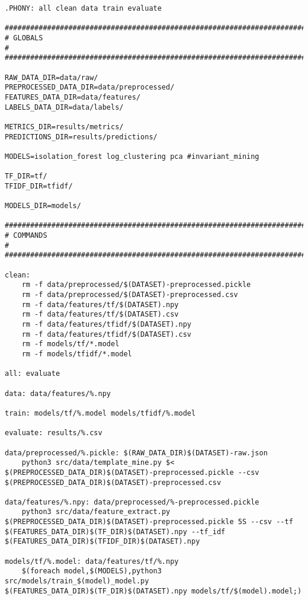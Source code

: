 \begin{lstlisting}
.PHONY: all clean data train evaluate

#################################################################################
# GLOBALS                                                                       #
#################################################################################

RAW_DATA_DIR=data/raw/
PREPROCESSED_DATA_DIR=data/preprocessed/
FEATURES_DATA_DIR=data/features/
LABELS_DATA_DIR=data/labels/

METRICS_DIR=results/metrics/
PREDICTIONS_DIR=results/predictions/

MODELS=isolation_forest log_clustering pca #invariant_mining 

TF_DIR=tf/
TFIDF_DIR=tfidf/

MODELS_DIR=models/

#################################################################################
# COMMANDS                                                                      #
#################################################################################

clean:
	rm -f data/preprocessed/$(DATASET)-preprocessed.pickle
	rm -f data/preprocessed/$(DATASET)-preprocessed.csv
	rm -f data/features/tf/$(DATASET).npy
	rm -f data/features/tf/$(DATASET).csv
	rm -f data/features/tfidf/$(DATASET).npy
	rm -f data/features/tfidf/$(DATASET).csv
	rm -f models/tf/*.model
	rm -f models/tfidf/*.model

all: evaluate

data: data/features/%.npy

train: models/tf/%.model models/tfidf/%.model

evaluate: results/%.csv

data/preprocessed/%.pickle: $(RAW_DATA_DIR)$(DATASET)-raw.json
	python3 src/data/template_mine.py $< $(PREPROCESSED_DATA_DIR)$(DATASET)-preprocessed.pickle --csv $(PREPROCESSED_DATA_DIR)$(DATASET)-preprocessed.csv

data/features/%.npy: data/preprocessed/%-preprocessed.pickle
	python3 src/data/feature_extract.py $(PREPROCESSED_DATA_DIR)$(DATASET)-preprocessed.pickle 5S --csv --tf $(FEATURES_DATA_DIR)$(TF_DIR)$(DATASET).npy --tf_idf $(FEATURES_DATA_DIR)$(TFIDF_DIR)$(DATASET).npy

models/tf/%.model: data/features/tf/%.npy
	$(foreach model,$(MODELS),python3 src/models/train_$(model)_model.py $(FEATURES_DATA_DIR)$(TF_DIR)$(DATASET).npy models/tf/$(model).model;)


\end{lstlisting}
